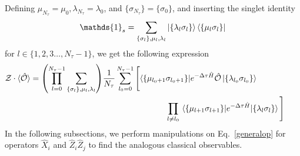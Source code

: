 \documentclass[../thesis_main.tex]{subfiles}
\begin{document}
Defining $\mu_{N_\tau} = \mu_0, \lambda _{N_\tau} = \lambda _0$, and $\{\sigma_{N_\tau}\} = \{\sigma_0\}$, and inserting the singlet identity 
\begin{equation}
    \mathds{1}_s = \sum_{\{\sigma_l \}, \mu_l, \lambda_l} \ket{\{\lambda_{l} \sigma_{l}\}}\bra{\{\mu_{l} \sigma_{l}\}}
\end{equation} 
for $l \in \{1, 2, 3 \ldots, N_\tau - 1\}$, we get the following expression
\begingroup
\allowdisplaybreaks
\begin{align}
    \mathcal{Z} \cdot \langle \hat{\mathcal{O}} \rangle = \qty(\prod_{l=0}^{N_\tau - 1} \sum_{\{\sigma_l \}, \mu_l, \lambda_l}) \frac{1}{N_\tau} \sum_{l_0 = 0}^{N_\tau - 1} \Bigg[\langle\{\mu_{l_0+1} & \sigma _{l_0+1}\}| {e^{-\Delta \tau \hat{H}} \hat{\mathcal{O}}}\ket{\{\lambda_{l_0} \sigma _{l_0}\}} \nonumber \\ 
    & \prod_{l \neq l_0} \mel{\{\mu_{l+1} \sigma _{l+1}\}}{e^{-\Delta \tau \hat{H}}}{\{\lambda_{l} \sigma _{l}\}} \Bigg] \qquad
    \label{generalop}
\end{align}
\endgroup
In the following subsections, we perform manipulations on Eq.~\eqref{generalop} for operators $\hat{X}_i$ and $\hat{Z}_i \hat{Z}_j$ to find the analogous classical observables.
\end{document}
